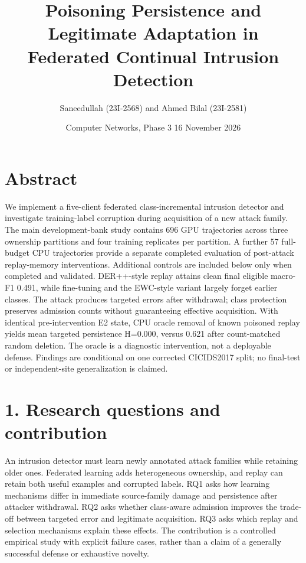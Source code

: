 \documentclass[
  10pt,
  a4paper,
]{article}
\title{Poisoning Persistence and Legitimate Adaptation in Federated
Continual Intrusion Detection}
\author{Saneedullah (23I-2568) and Ahmed Bilal (23I-2581)}
\date{Computer Networks, Phase 3 \textbar{} 16 November 2026}
\begin{document}
\maketitle

\hypertarget{abstract}{%
\section{Abstract}\label{abstract}}

We implement a five-client federated class-incremental intrusion
detector and investigate training-label corruption during acquisition of
a new attack family. The main development-bank study contains 696 GPU
trajectories across three ownership partitions and four training
replicates per partition. A further 57 full-budget CPU trajectories
provide a separate completed evaluation of post-attack replay-memory
interventions. Additional controls are included below only when
completed and validated. DER++-style replay attains clean final eligible
macro-F1 0.491, while fine-tuning and the EWC-style variant largely
forget earlier classes. The attack produces targeted errors after
withdrawal; class protection preserves admission counts without
guaranteeing effective acquisition. With identical pre-intervention E2
state, CPU oracle removal of known poisoned replay yields mean targeted
persistence H=0.000, versus 0.621 after count-matched random deletion.
The oracle is a diagnostic intervention, not a deployable defense.
Findings are conditional on one corrected CICIDS2017 split; no
final-test or independent-site generalization is claimed.

\hypertarget{research-questions-and-contribution}{%
\section{1. Research questions and
contribution}\label{research-questions-and-contribution}}

An intrusion detector must learn newly annotated attack families while
retaining older ones. Federated learning adds heterogeneous ownership,
and replay can retain both useful examples and corrupted labels. RQ1
asks how learning mechanisms differ in immediate source-family damage
and persistence after attacker withdrawal. RQ2 asks whether class-aware
admission improves the trade-off between targeted error and legitimate
acquisition. RQ3 asks which replay and selection mechanisms explain
these effects. The contribution is a controlled empirical study with
explicit failure cases, rather than a claim of a generally successful
defense or exhaustive novelty.
\end{document}

